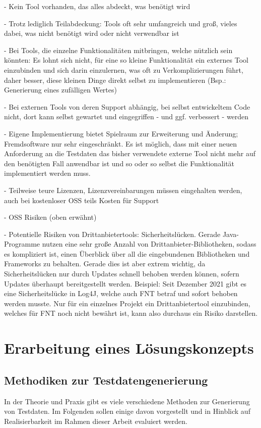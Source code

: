 - Kein Tool vorhanden, das alles abdeckt, was benötigt wird

- Trotz lediglich Teilabdeckung: Tools oft sehr umfangreich und groß, vieles dabei, was nicht benötigt wird oder nicht verwendbar ist

- Bei Tools, die einzelne Funktionalitäten mitbringen, welche nützlich sein könnten: Es lohnt sich nicht, für eine so kleine Funktionalität ein externes Tool einzubinden und sich darin einzulernen, was oft zu Verkomplizierungen führt, daher besser, diese kleinen Dinge direkt selbst zu implementieren (Bsp.: Generierung eines zufälligen Wertes)

- Bei externen Tools von deren Support abhängig, bei selbst entwickeltem Code nicht, dort kann selbst gewartet und eingegriffen - und ggf. verbessert - werden

- Eigene Implementierung bietet Spielraum zur Erweiterung und Änderung; Fremdsoftware nur sehr eingeschränkt. Es ist möglich, dass mit einer neuen Anforderung an die Testdaten das bisher verwendete externe Tool nicht mehr auf den benötigten Fall anwendbar ist und so oder so selbst die Funktionalität implementiert werden muss.

- Teilweise teure Lizenzen, Lizenzvereinbarungen müssen eingehalten werden, auch bei kostenloser \ac{OSS} teils Kosten für Support \cite{singh:2015}\cite{veracode:2021}

- \ac{OSS} Risiken (oben erwähnt)

- Potentielle Risiken von Drittanbietertools: Sicherheitslücken. Gerade Java-Programme nutzen eine sehr große Anzahl von Drittanbieter-Bibliotheken, sodass es kompliziert ist, einen Überblick über all die eingebundenen Bibliotheken und Frameworks zu behalten. Gerade dies ist aber extrem wichtig, da Sicherheitslücken nur durch Updates schnell behoben werden können, sofern Updates überhaupt bereitgestellt werden. \cite{veracode:2021} Beispiel: Seit Dezember 2021 gibt es eine Sicherheitslücke in Log4J, welche auch FNT betraf und sofort behoben werden musste. \cite{mit:2021} Nur für ein einzelnes Projekt ein Drittanbietertool einzubinden, welches für FNT noch nicht bewährt ist, kann also durchaus ein Risiko darstellen.

\section{Erarbeitung eines Lösungskonzepts}\label{sec:loesungskonzept}

\subsection{Methodiken zur Testdatengenerierung}\label{subsec:methodiken}
In der Theorie und Praxis gibt es viele verschiedene Methoden zur Generierung von Testdaten. Im Folgenden sollen einige davon vorgestellt und in Hinblick auf Realisierbarkeit im Rahmen dieser Arbeit evaluiert werden.

